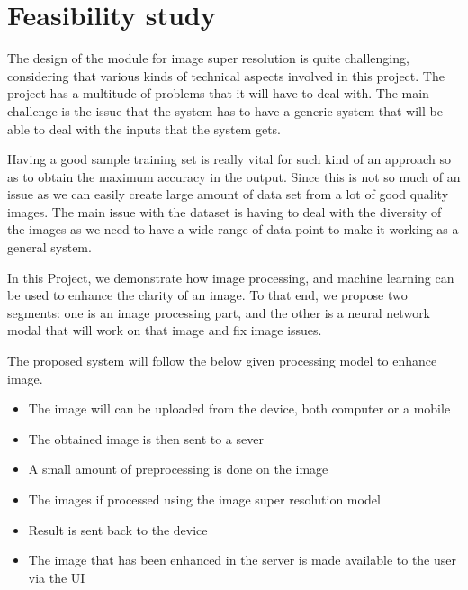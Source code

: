 \chapter{Feasibility study}

The design of the module for image super resolution is quite challenging, considering that various kinds of technical aspects involved in this project. The project has a multitude of problems that it will have to deal with. The main challenge is the issue that the system has to have a generic system that will be able to deal with the inputs that the system gets.

Having a good sample training set is really vital for such kind of an approach so as to obtain the maximum accuracy in the output. Since this is not so much of an issue as we can easily create large amount of data set from a lot of good quality images. The main issue with the dataset is having to deal with the diversity of the images as we need to have a wide range of data point to make it working as a general system.

In this Project, we demonstrate how image processing, and machine learning can be used to enhance the clarity of an image. To that end, we propose two segments: one is an image processing part, and the other is a neural network modal that will work on that image and fix image issues.

The proposed system will follow the below given processing model to enhance image.

\begin{itemize}
    \item The image will can be uploaded from the device, both computer or a mobile
    \item The obtained image is then sent to a sever
    \item A small amount of preprocessing is done on the image
    \item The images if processed using the image super resolution model
    \item Result is sent back to the device
    \item The image that has been enhanced in the server is made available to the user via the UI
\end{itemize}
